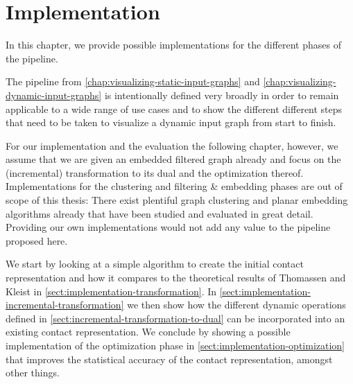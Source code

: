 \chapter{Implementation}
\label{chap:implementation}

In this chapter, we provide possible implementations for the different phases of the pipeline.

The pipeline from \cref{chap:visualizing-static-input-graphs} and \cref{chap:visualizing-dynamic-input-graphs} is intentionally defined very broadly in order to remain applicable to a wide range of use cases and to show the different different steps that need to be taken to visualize a dynamic input graph from start to finish.

For our implementation and the evaluation the following chapter, however, we assume that we are given an embedded filtered graph already and focus on the (incremental) transformation to its dual and the optimization thereof. Implementations for the clustering and filtering \& embedding phases are out of scope of this thesis: There exist plentiful graph clustering and planar embedding algorithms already that have been studied and evaluated in great detail. Providing our own implementations would not add any value to the pipeline proposed here.

We start by looking at a simple algorithm to create the initial contact representation and how it compares to the theoretical results of Thomassen \cite{thomassen1992plane} and Kleist \cite{kleist2018drawing} \cite{kleist2019planar} in \cref{sect:implementation-transformation}. In \cref{sect:implementation-incremental-transformation} we then show how the different dynamic operations defined in \cref{sect:incremental-transformation-to-dual} can be incorporated into an existing contact representation. We conclude by showing a possible implementation of the optimization phase in \cref{sect:implementation-optimization} that improves the statistical accuracy of the contact representation, amongst other things.

\clearpage

\clearpage

\clearpage
